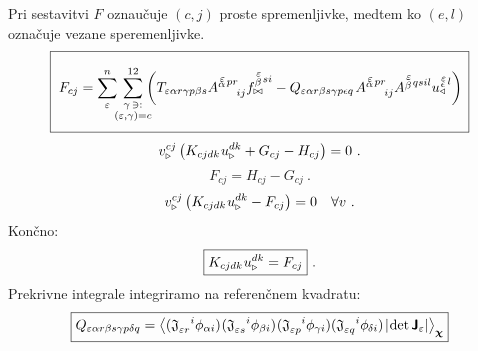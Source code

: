 \vspace{1mm}
Pri sestavitvi $F$ oznaučuje $(c, j)$ proste spremenljivke, medtem ko $(e, l)$ označuje vezane speremenljivke.
\vspace{-1mm}
\begin{equation}
   \boxed{ \phantom{\rule[-9mm]{1mm}{18mm}}
   F_{c j} =
   \sum^n_\varepsilon
   \mkern-7mu
   \sum_{\substack{\gamma \, \ni: \\
      (\varepsilon,\gamma) = c}}^{12}
   \mkern-10mu
   \qty(
   T_{\varepsilon   \alpha r   \gamma p   \beta s}
   A^{\substack{\mkern2mu \varepsilon \\[-0.65mm] \alpha} \mkern2mu p r}_{\mkern29mu i j}
   f^{\substack{\mkern2mu \varepsilon \\[0.05mm] \beta} \mkern2mu s i}_{\bowtie}
   -
   Q_{\varepsilon   \alpha r   \beta s   \gamma p   \epsilon q} \mkern2mu
   A^{\substack{\mkern2mu \varepsilon \\[-0.65mm] \alpha} \mkern2mu p r}_{\mkern29mu i j}
   A^{\substack{\mkern2mu \varepsilon \\[0.05mm] \beta} \mkern2mu q s i l}
   u^{\substack{\mkern2mu \varepsilon \\[-0.55mm] \epsilon} \mkern2mu l}_\triangleleft ) \mkern3mu }
\end{equation}
\begin{equation*}
   v^{c j}_{\triangleright} \left(
   K_{c j d k} \mkern1mu u^{d k}_\triangleright
   +
   G_{c j}
   -
   H_{c j}
   \right) = 0 \ .
\end{equation*}
\begin{equation*}
   F_{c j} = H_{c j} - G_{c j} \ .
\end{equation*}
\begin{equation*}
   v^{c j}_{\triangleright} \left(
   K_{c j d k} \mkern1mu u^{d k}_\triangleright
   -
   F_{c j}
   \right) = 0 \quad \forall v \ .
\end{equation*}
Končno:
\begin{equation}
   \boxed{
   K_{c j d k} \mkern1mu u^{d k}_\triangleright
   =
   F_{c j} } \ .
\end{equation}
Prekrivne integrale integriramo na referenčnem kvadratu:
\begin{equation}
   \boxed{
   Q_{\varepsilon  \alpha r \beta s \gamma p \delta q}
   =
   \expval{
      ( \mathfrak{J}_{\varepsilon r}^{\mkern18mu i} \phi_{\alpha i}) \mkern1mu
      ( \mathfrak{J}_{\varepsilon s}^{\mkern18mu i} \phi_{\beta i} ) \mkern1mu
      ( \mathfrak{J}_{\varepsilon p}^{\mkern18mu i} \phi_{\gamma i})
      ( \mathfrak{J}_{\varepsilon q}^{\mkern18mu i} \phi_{\mkern-1mu \delta i} ) \mkern2mu
      |\mkern-2mu \det \bm{\mathsf{J}}_\varepsilon | }_{\bm{\chi}} }
\end{equation}
